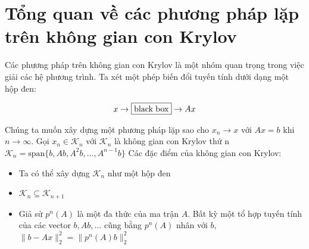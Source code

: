 \documentclass[14pt, a4paper]{article}
\numberwithin{equation}{section}
\numberwithin{algorithm}{section}
\numberwithin{figure}{section}
\numberwithin{dl}{section}
\numberwithin{md}{section}
\numberwithin{bd}{section}
\begin{document}
\begin{titlepage}
    
    
    
     
    
    \vfill %
    
\end{titlepage}

\cleardoublepage
{}
\tableofcontents
\newpage
\listoffigures
\cleardoublepage
{}


\newpage

\nocite{*}

\section{Tổng quan về các phương pháp lặp trên không gian con Krylov}

Các phương pháp trên không gian con Krylov là một nhóm quan trọng trong việc giải các hệ phương trình. Ta xét một phép biến đổi tuyến tính dưới dạng một hộp đen:

\begin{equation}
    x \rightarrow \boxed{\mathrm{black} \thickspace \mathrm{box}} \rightarrow Ax
\end{equation}

Chúng ta muốn xây dựng một phương pháp lặp sao cho $x_n \rightarrow x$ với $Ax=b$ khi $n \rightarrow \infty$. Gọi $x_n \in \mathcal{K}_n$ với $\mathcal{K}_n$ là không gian con Krylov thứ n $\mathcal{K}_n=\mathrm{span} \lbrace b, Ab, A^2b, \dots, A^{n-1}b \rbrace$
Các đặc điểm của không gian con Krylov:
\begin{itemize}
    \item Ta có thể xây dựng $\mathcal{K}_n$ như một hộp đen
    \item $\mathcal{K}_n \subseteq \mathcal{K}_{n+1}$
    \item Giả sử $p^n(A)$ là một đa thức của ma trận $A$. Bất kỳ một tổ hợp tuyến tính của các vector $b, Ab, \dots$ cũng bằng $p^n(A)$ nhân với $b$, $\lVert b - Ax \rVert_2^2 = \lVert p^n(A)b \rVert_2^2$
\end{itemize}
\end{document}
